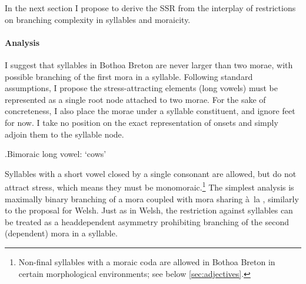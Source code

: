 In the next section I propose to derive the SSR from the interplay of restrictions on branching complexity in syllables and moraicity.

\paragraph{Analysis}
\label{sec:analysis-8}

I suggest that syllables in Bothoa Breton are never larger than two morae, with possible branching of the first mora in a syllable. Following standard assumptions, I propose the stress-attracting elements (\ie long vowels) must be represented as a single root node attached to two morae. For the sake of concreteness, I also place the morae under a syllable constituent, and ignore feet for now. I take no position on the exact representation of onsets and simply adjoin them to the syllable node.

\ex.\label{ex:biou-prosody}Bimoraic long vowel: \ipa{[ˈbiː]} `cows'\\



Syllables with a short vowel closed by a single consonant are allowed, but do not attract stress, which means they must be monomoraic.\footnote{Non-final syllables with a moraic coda are allowed in Bothoa Breton in certain morphological environments; see below \cref{sec:adjectives}.}  The simplest analysis is maximally binary branching of a mora coupled with mora sharing à~la \citet{broselow97:_syllab}, similarly to the proposal for Welsh. Just as in Welsh, the restriction against  syllables can be treated as a head\endash dependent asymmetry prohibiting branching of the second (dependent) mora in a syllable.

